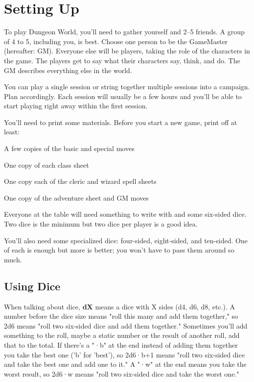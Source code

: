 \chapter{Setting Up}
 

To play Dungeon World, you'll need to gather yourself and 2–5 friends. A group of 4 to 5, including you, is best. Choose one person to be the GameMaster (hereafter: GM). Everyone else will be players, taking the role of the characters in the game. The players get to say what their characters say, think, and do. The GM describes everything else in the world.

 

You can play a single session or string together multiple sessions into a campaign. Plan accordingly. Each session will usually be a few hours and you'll be able to start playing right away within the first session.

 

You'll need to print some materials. Before you start a new game, print off at least:

 
\startitemize[1,packed]

\item A few copies of the basic and special moves

 
\item One copy of each class sheet

 
\item One copy each of the cleric and wizard spell sheets

 
\item One copy of the adventure sheet and GM moves


\stopitemize
 

Everyone at the table will need something to write with and some six-sided dice. Two dice is the minimum but two dice per player is a good idea.

 

You'll also need some specialized dice: four-sided, eight-sided, and ten-sided. One of each is enough but more is better; you won't have to pass them around so much.

 
\section{Using Dice}   
 

When talking about dice, {\bf dX}  means a dice with X sides (d4, d6, d8, etc.). A number before the dice size means "roll this many and add them together," so 2d6 means "roll two six-sided dice and add them together." Sometimes you'll add something to the roll, maybe a static number or the result of another roll, add that to the total. If there's a "·b" at the end instead of adding them together you take the best one ('b' for 'best'), so 2d6·b+1 means "roll two six-sided dice and take the best one and add one to it." A "·w" at the end means you take the worst result, so 2d6·w means "roll two six-sided dice and take the worst one."

 
